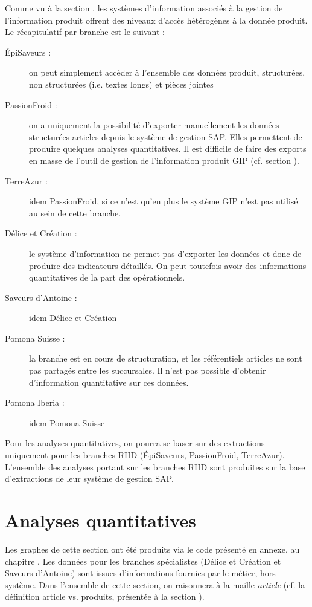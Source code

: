         Comme vu à la section , les systèmes d'information associés à la gestion de l'information produit offrent des niveaux d'accès hétérogènes à la donnée produit.
        Le récapitulatif par branche est le suivant : 
        \begin{description}
            \item[\'{E}piSaveurs :] on peut simplement accéder à l'ensemble des données produit, structurées, non structurées (i.e. textes longs) et pièces jointes
            \item[PassionFroid :] on a uniquement la possibilité d'exporter manuellement les données structurées articles depuis le système de gestion SAP.
            Elles permettent de produire quelques analyses quantitatives.
            Il est difficile de faire des exports en masse de l'outil de gestion de l'information produit GIP (cf. section ).
            \item[TerreAzur :] idem PassionFroid, si ce n'est qu'en plus le système GIP n'est pas utilisé au sein de cette branche.
            \item[Délice et Création :] le système d'information ne permet pas d'exporter les données et donc de produire des indicateurs détaillés. On peut toutefois avoir des informations quantitatives de la part des opérationnels.
            \item[Saveurs d'Antoine :] idem Délice et Création
            \item[Pomona Suisse :] la branche est en cours de structuration, et les référentiels articles ne sont pas partagés entre les succursales. Il n'est pas possible d'obtenir d'information quantitative sur ces données.
            \item[Pomona Iberia :] idem Pomona Suisse
        \end{description}

        Pour les analyses quantitatives, on pourra se baser sur des extractions uniquement pour les branches RHD (\'{E}piSaveurs, PassionFroid, TerreAzur).
        L'ensemble des analyses portant sur les branches RHD sont produites sur la base d'extractions de leur système de gestion SAP.

        \section{Analyses quantitatives}

        Les graphes de cette section ont été produits via le code présenté en annexe, au chapitre .
        Les données pour les branches spécialistes (Délice et Création et Saveurs d'Antoine) sont issues d'informations fournies par le métier, hors système.
        Dans l'ensemble de cette section, on raisonnera à la maille \emph{article} (cf. la définition article vs. produits, présentée à la section ).

